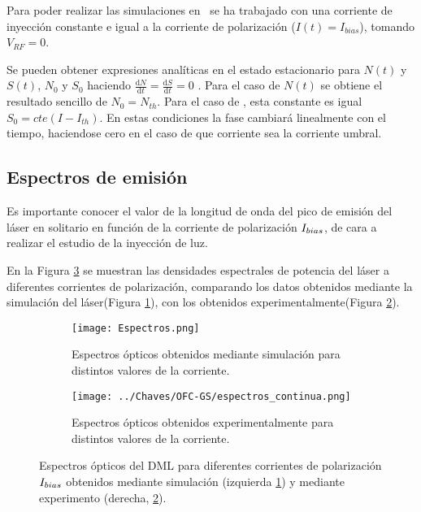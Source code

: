 
Para poder realizar las simulaciones en \cw\ se ha trabajado con una corriente de inyección constante e igual a la corriente de polarización ($I(t) = I_{bias}$), tomando $V_{RF} = 0$.

Se pueden obtener expresiones anal\'iticas en el estado estacionario para $N(t)$ y $S(t)$, $N_0$ y $S_0$ haciendo $\frac{\mathrm{d} N}{\mathrm{d} t} = \frac{\mathrm{d} S}{\mathrm{d} t} = 0$ \cite{van1995semiconductor}. Para el caso de $N(t)$ se obtiene el resultado sencillo de $N_0 = N_{th}$. Para el caso de \s, esta constante es igual $S_0 = cte (I- I_{th})$. En estas condiciones la fase cambiará linealmente con el tiempo, haciendose cero en el caso de que corriente sea la corriente umbral.

\subsection{Espectros de emisión}
	\label{Sol:CW:Spectr}

	Es importante conocer el valor de la longitud de onda del pico de emisión del láser en solitario en función de la corriente de polarización $I_{bias}$, de cara a realizar el estudio de la inyección de luz.

	En la Figura \ref{Img:spectrosCW} se muestran las densidades espectrales de potencia del láser a diferentes corrientes de polarización, comparando los datos obtenidos mediante la simulación del láser(Figura \ref{Img:spectrosCW:sim}), con los obtenidos experimentalmente(Figura \ref{Img:spectrosCW:exp}).

		\begin{figure}[H]
			\centering
			\begin{subfigure}{0.45\textwidth}
				\centering
				\texttt{[image: Espectros.png]}
				\caption{\label{Img:spectrosCW:sim}Espectros ópticos obtenidos mediante simulación para distintos valores de la corriente.}
			\end{subfigure}
			\begin{subfigure}{0.45\textwidth}
				\centering
				\texttt{[image: ../Chaves/OFC-GS/espectros\_continua.png]}
				\caption{\label{Img:spectrosCW:exp}Espectros ópticos obtenidos experimentalmente para distintos valores de la corriente.}	
			\end{subfigure}
			\caption{\label{Img:spectrosCW}Espectros ópticos del DML para diferentes corrientes de polarización $I_{bias}$ obtenidos mediante simulación (izquierda \ref{Img:spectrosCW:sim}) y mediante experimento (derecha, \ref{Img:spectrosCW:exp}).}
		\end{figure}

